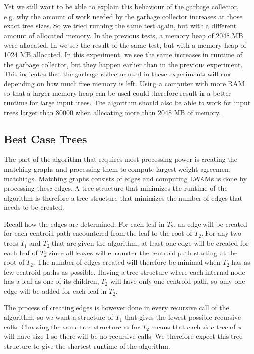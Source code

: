 Yet we still want to be able to explain this behaviour of the garbage collector, e.g. why the amount of work needed by the garbage collector increases at those exact tree sizes. So we tried running the same test again, but with a different amount of allocated memory. In the previous tests, a memory heap of 2048 MB were allocated. In  we see the result of the same test, but with a memory heap of 1024 MB allocated. In this experiment, we see the same increases in runtime of the garbage collector, but they happen earlier than in the previous experiment. This indicates that the garbage collector used in these experiments will run depending on how much free memory is left. Using a computer with more RAM so that a larger memory heap can be used could therefore result in a better runtime for large input trees. The algorithm should also be able to work for input trees larger than 80000 when allocating more than 2048 MB of memory.

\subsection{Best Case Trees}
The part of the algorithm that requires most processing power is creating the matching graphs and processing them to compute largest weight agreement matchings. Matching graphs consists of edges and computing LWAMs is done by processing these edges. A tree structure that minimizes the runtime of the algorithm is therefore a tree structure that minimizes the number of edges that needs to be created.

Recall how the edges are determined. For each leaf in $T_2$, an edge will be created for each centroid path encountered from the leaf to the root of $T_2$. For any two trees $T_1$ and $T_2$ that are given the algorithm, at least one edge will be created for each leaf of $T_2$ since all leaves will encounter the centroid path starting at the root of $T_2$. The number of edges created will therefore be minimal when $T_2$ has as few centroid paths as possible. Having a tree structure where each internal node has a leaf as one of its children, $T_2$ will have only one centroid path, so only one edge will be added for each leaf in $T_2$.

The process of creating edges is however done in every recursive call of the algorithm, so we want a structure of $T_1$ that gives the fewest possible recursive calls. Choosing the same tree structure as for $T_2$ means that each side tree of $\pi$ will have size 1 so there will be no recursive calls. We therefore expect this tree structure to give the shortest runtime of the algorithm.

